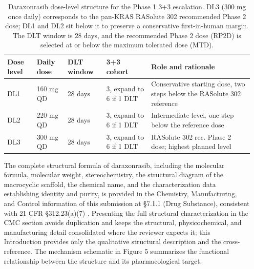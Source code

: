 \begin{table}[t]
\caption{Daraxonrasib dose-level structure for the Phase 1 3+3 escalation. DL3 (300
mg once daily) corresponds to the pan-KRAS RASolute 302 recommended Phase 2 dose;
DL1 and DL2 sit below it to preserve a conservative first-in-human margin. The DLT
window is 28 days, and the recommended Phase 2 dose (RP2D) is selected at or below
the maximum tolerated dose (MTD).}
\label{tab:sec02-doselevels}
\centering
\begin{tabularx}{\textwidth}{L{1.6cm} L{2.5cm} C{1.7cm} L{3.0cm} Y}
\toprule
\textbf{Dose level} & \textbf{Daily dose} & \textbf{DLT window} & \textbf{3+3 cohort} & \textbf{Role and rationale} \\
\midrule
DL1 & 160 mg QD & 28 days & 3, expand to 6 if 1 DLT & Conservative starting dose, two steps below the RASolute 302 reference \\
DL2 & 220 mg QD & 28 days & 3, expand to 6 if 1 DLT & Intermediate level, one step below the reference dose \\
DL3 & 300 mg QD & 28 days & 3, expand to 6 if 1 DLT & RASolute 302 rec. Phase 2 dose; highest planned level \\
\bottomrule
\end{tabularx}
\end{table}
\vspace*{-1.4cm}

The complete structural formula of daraxonrasib, including the molecular formula,
molecular weight, stereochemistry, the structural diagram of the macrocyclic
scaffold, the chemical name, and the characterization data establishing identity
and purity, is provided in the Chemistry, Manufacturing, and Control information of
this submission at \S 7.1.1 (Drug Substance), consistent with 21 CFR \S 312.23(a)(7)
\cite{phase1guidance, cfr312paiuni}. Presenting the full structural characterization
in the CMC section avoids duplication and keeps the structural, physicochemical, and
manufacturing detail consolidated where the reviewer expects it; this Introduction
provides only the qualitative structural description and the cross-reference. The
mechanism schematic in Figure 5 summarizes the functional relationship between the
structure and its pharmacological target.


